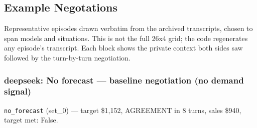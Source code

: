 \subsection{Example Negotations}
\label{app:transcript}

Representative episodes drawn verbatim from the archived transcripts, chosen to span models and situations. This is not the full 26x4 grid; the code regenerates any episode's transcript. Each block shows the private context both sides saw followed by the turn-by-turn negotiation.

\subsubsection*{deepseek: No forecast --- baseline negotiation (no demand signal)}
\noindent\texttt{no\_forecast} (set\_0) --- target \$1,152, AGREEMENT in 8 turns, sales \$940, target met: False.

